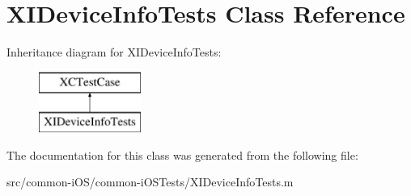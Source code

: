 \hypertarget{interface_x_i_device_info_tests}{}\section{X\+I\+Device\+Info\+Tests Class Reference}
\label{interface_x_i_device_info_tests}
Inheritance diagram for X\+I\+Device\+Info\+Tests\+:\begin{figure}[H]
\begin{center}
\leavevmode
\includegraphics[height=2.000000cm]{interface_x_i_device_info_tests}
\end{center}
\end{figure}


The documentation for this class was generated from the following file\+:\begin{DoxyCompactItemize}
\item 
src/common-\/i\+O\+S/common-\/i\+O\+S\+Tests/X\+I\+Device\+Info\+Tests.\+m\end{DoxyCompactItemize}
